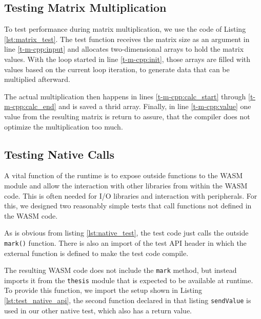 \subsection{Testing Matrix Multiplication}\label{subsec:m_test_matrix}

To test performance during matrix multiplication, we use the code of Listing \ref{lst:matrix_test}. The test function receives the matrix size as an argument in line \ref{t-m-cpp:input} and allocates two-dimensional arrays to hold the matrix values. With the loop started in line \ref{t-m-cpp:init}, those arrays are filled with values based on the current loop iteration, to generate data that can be multiplied afterward.

The actual multiplication then happens in lines \ref{t-m-cpp:calc_start} through 
\ref{t-m-cpp:calc_end} and is saved a thrid array. Finally, in line \ref{t-m-cpp:value} one value from the resulting matrix is return to assure, that the compiler does not optimize the multiplication too much.



\subsection{Testing Native Calls}\label{subsec:native}

A vital function of the runtime is to expose outside functions to the WASM module and allow the interaction with other libraries from within the WASM code. This is often needed for I/O libraries and interaction with peripherals. For this, we designed two reasonably simple tests that call functions not defined in the WASM code.



As is obvious from listing \ref{lst:native_test}, the test code just calls the outside \lstinline{mark()} function. There is also an import of the test API header in which the external function is defined to make the test code compile.



The resulting WASM code does not include the \lstinline{mark} method, but instead imports it from the \lstinline{thesis} module that is expected to be available at runtime. To provide this function, we import the setup shown in Listing \ref{lst:test_native_api}, the second function declared in that listing \lstinline{sendValue} is used in our other native test, which also has a return value.

